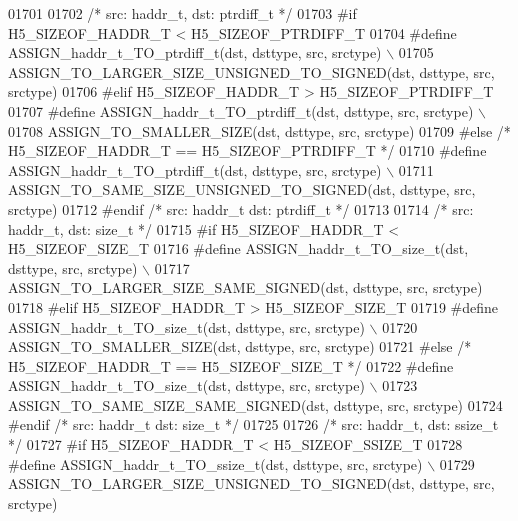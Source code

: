 \begin{DoxyCode}
01701 
01702 \textcolor{comment}{/* src: haddr\_t, dst: ptrdiff\_t */}
01703 \textcolor{preprocessor}{#if H5\_SIZEOF\_HADDR\_T < H5\_SIZEOF\_PTRDIFF\_T}
01704 \textcolor{preprocessor}{    #define ASSIGN\_haddr\_t\_TO\_ptrdiff\_t(dst, dsttype, src, srctype) \(\backslash\)}
01705 \textcolor{preprocessor}{        ASSIGN\_TO\_LARGER\_SIZE\_UNSIGNED\_TO\_SIGNED(dst, dsttype, src, srctype)}
01706 \textcolor{preprocessor}{#elif H5\_SIZEOF\_HADDR\_T > H5\_SIZEOF\_PTRDIFF\_T}
01707 \textcolor{preprocessor}{    #define ASSIGN\_haddr\_t\_TO\_ptrdiff\_t(dst, dsttype, src, srctype) \(\backslash\)}
01708 \textcolor{preprocessor}{        ASSIGN\_TO\_SMALLER\_SIZE(dst, dsttype, src, srctype)}
01709 \textcolor{preprocessor}{#else }\textcolor{comment}{/* H5\_SIZEOF\_HADDR\_T == H5\_SIZEOF\_PTRDIFF\_T */}\textcolor{preprocessor}{}
01710 \textcolor{preprocessor}{    #define ASSIGN\_haddr\_t\_TO\_ptrdiff\_t(dst, dsttype, src, srctype) \(\backslash\)}
01711 \textcolor{preprocessor}{        ASSIGN\_TO\_SAME\_SIZE\_UNSIGNED\_TO\_SIGNED(dst, dsttype, src, srctype)}
01712 \textcolor{preprocessor}{#endif }\textcolor{comment}{/* src: haddr\_t dst: ptrdiff\_t */}\textcolor{preprocessor}{}
01713 
01714 \textcolor{comment}{/* src: haddr\_t, dst: size\_t */}
01715 \textcolor{preprocessor}{#if H5\_SIZEOF\_HADDR\_T < H5\_SIZEOF\_SIZE\_T}
01716 \textcolor{preprocessor}{    #define ASSIGN\_haddr\_t\_TO\_size\_t(dst, dsttype, src, srctype) \(\backslash\)}
01717 \textcolor{preprocessor}{        ASSIGN\_TO\_LARGER\_SIZE\_SAME\_SIGNED(dst, dsttype, src, srctype)}
01718 \textcolor{preprocessor}{#elif H5\_SIZEOF\_HADDR\_T > H5\_SIZEOF\_SIZE\_T}
01719 \textcolor{preprocessor}{    #define ASSIGN\_haddr\_t\_TO\_size\_t(dst, dsttype, src, srctype) \(\backslash\)}
01720 \textcolor{preprocessor}{        ASSIGN\_TO\_SMALLER\_SIZE(dst, dsttype, src, srctype)}
01721 \textcolor{preprocessor}{#else }\textcolor{comment}{/* H5\_SIZEOF\_HADDR\_T == H5\_SIZEOF\_SIZE\_T */}\textcolor{preprocessor}{}
01722 \textcolor{preprocessor}{    #define ASSIGN\_haddr\_t\_TO\_size\_t(dst, dsttype, src, srctype) \(\backslash\)}
01723 \textcolor{preprocessor}{        ASSIGN\_TO\_SAME\_SIZE\_SAME\_SIGNED(dst, dsttype, src, srctype)}
01724 \textcolor{preprocessor}{#endif }\textcolor{comment}{/* src: haddr\_t dst: size\_t */}\textcolor{preprocessor}{}
01725 
01726 \textcolor{comment}{/* src: haddr\_t, dst: ssize\_t */}
01727 \textcolor{preprocessor}{#if H5\_SIZEOF\_HADDR\_T < H5\_SIZEOF\_SSIZE\_T}
01728 \textcolor{preprocessor}{    #define ASSIGN\_haddr\_t\_TO\_ssize\_t(dst, dsttype, src, srctype) \(\backslash\)}
01729 \textcolor{preprocessor}{        ASSIGN\_TO\_LARGER\_SIZE\_UNSIGNED\_TO\_SIGNED(dst, dsttype, src, srctype)}

\end{DoxyCode}
